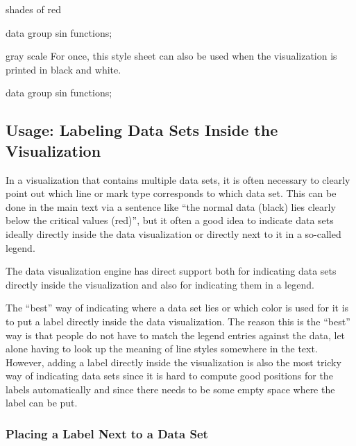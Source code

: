 \begin{stylesheet}{shades of red}
\begin{codeexample}[width=10cm]
\tikz \datavisualization [
  visualize as smooth line/.list=
    {1,2,3,4,5,6,7,8},
  example visualization,
  style sheet=shades of red]
data group {sin functions};
\end{codeexample}
\end{stylesheet}

\begin{stylesheet}{gray scale}
    For once, this style sheet can also be used when the visualization is
    printed in black and white.
\begin{codeexample}[width=10cm]
\tikz \datavisualization [
  visualize as smooth line/.list=
    {1,2,3,4,5,6,7,8},
  example visualization,
  style sheet=gray scale]
data group {sin functions};
\end{codeexample}
\end{stylesheet}


\subsection{Usage: Labeling Data Sets Inside the Visualization}

In a visualization that contains multiple data sets, it is often necessary to
clearly point out which line or mark type corresponds to which data set. This
can be done in the main text via a sentence like ``the normal data (black) lies
clearly below the critical values (red)'', but it often a good idea to indicate
data sets ideally directly inside the data visualization or directly next to it
in a so-called legend.

The data visualization engine has direct support both for indicating data sets
directly inside the visualization and also for indicating them in a legend.

The ``best'' way of indicating where a data set lies or which color is used for
it is to put a label directly inside the data visualization. The reason this is
the ``best'' way is that people do not have to match the legend entries against
the data, let alone having to look up the meaning of line styles somewhere in
the text. However, adding a label directly inside the visualization is also the
most tricky way of indicating data sets since it is hard to compute good
positions for the labels automatically and since there needs to be some empty
space where the label can be put.


\subsubsection{Placing a Label Next to a Data Set}

